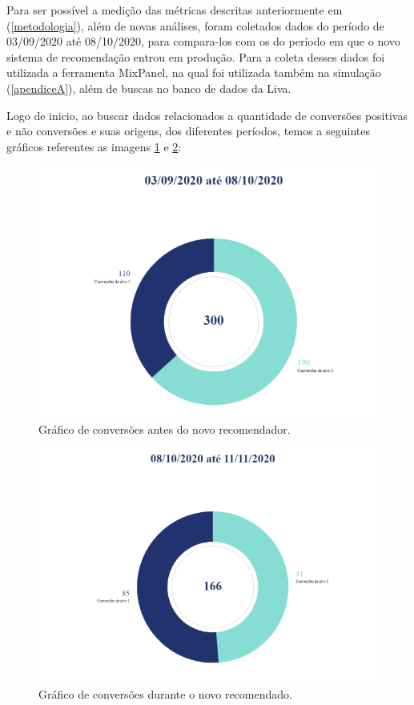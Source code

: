 Para ser possível a medição das métricas descritas anteriormente em (\ref{metodologia}), além de novas análises, foram coletados dados do período de 03/09/2020 até 08/10/2020, para compara-los com os do período em que o novo sistema de recomendação entrou em produção. Para a coleta desses dados foi utilizada a ferramenta MixPanel, na qual foi utilizada também na simulação (\ref{apendiceA}), além de buscas no banco de dados da Liva.

Logo de inicio, ao buscar dados relacionados a quantidade de conversões positivas e não conversões e suas origens, dos diferentes períodos, temos a seguintes gráficos referentes as imagens \ref{fig:grafico1} e \ref{fig:grafico2}:

\begin{figure}[H]
    \centering
    \includegraphics[scale=0.6]{figuras/desenvolvimento/grafico1.png}
    \caption[Gráfico de conversões antes do novo recomendador]{Gráfico de conversões antes do novo recomendador.}
    \label{fig:grafico1}
\end{figure}

\begin{figure}[H]
    \centering
    \includegraphics[scale=0.6]{figuras/desenvolvimento/grafico2.png}
    \caption[Gráfico de conversões durante o novo recomendador]{Gráfico de conversões durante o novo recomendado.}
    \label{fig:grafico2}
\end{figure}

